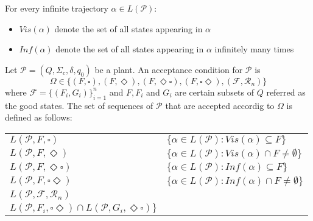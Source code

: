 \documentclass[table]{beamer}
\newcommand{\Plant}{\ensuremath{\mathcal{P}=(Q,\Sigma_c,\delta, q_0)}}
\newcommand{\AccpCond}{\ensuremath{\{(F,\square),(F,\Diamond ),(F,\Diamond\square),(F,\square\Diamond),(\mathcal{F},\mathcal{R}_n)\}}}
\begin{document}
\begin{frame}
	For every infinite trajectory $\alpha \in L(\mathcal{P})$:
	\begin{itemize}
		\item $Vis(\alpha)$ denote the set of all states appearing in $\alpha$
		\item $Inf(\alpha)$ denote the set of all states appearing in $\alpha$ infinitely many times
	\end{itemize}
\end{frame}

\begin{frame}
	\begin{dfn}
		Let $\Plant$ be a plant. An acceptance condition for $\mathcal{P}$ is
		$$ \Omega \in \AccpCond$$
		where $\mathcal{F} = \{(F_i,G_i)\}^{n}_{i=1}$ and $F, F_i$ and $G_i$ 
		are certain subsets of $Q$ referred as the good states. The set of sequences of $\mathcal{P}$ that are accepted
		accordig to $\Omega$ is defined as follows:
		\begin{adjustwidth}{-1cm}{-1cm}
		\begin{table}[]
			\begin{tabular}{ll}
			\hline
			\rowcolor{azzurro_chiaro}
			$L(\mathcal{P},F,\square)$ & $\{\alpha \in L(\mathcal{P}):Vis(\alpha)\subseteq F\}$ \\ 
			$L(\mathcal{P},F,\Diamond)$ & $\{\alpha \in L(\mathcal{P}):Vis(\alpha)\cap F \neq \emptyset\}$ \\ 
			\rowcolor{azzurro_chiaro}
			$L(\mathcal{P},F,\Diamond\square)$ & $\{\alpha \in L(\mathcal{P}):Inf(\alpha)\subseteq F\}$ \\ 
			$L(\mathcal{P},F,\square\Diamond)$ & $\{\alpha \in L(\mathcal{P}):Inf(\alpha)\cap F \neq \emptyset\}$\\ 
			\rowcolor{azzurro_chiaro}
			$L(\mathcal{P},\mathcal{F},\mathcal{R}_n)$ & \shortstack{
				$\{\alpha \in L(\mathcal{P}): \exists i \alpha \in$ \\
				$L(\mathcal{P},F_i,\square\Diamond) \cap L(\mathcal{P},G_i,\Diamond\square)\}$
			} \\ 
			\hline
			\end{tabular}
		\end{table}
		\end{adjustwidth}
	\end{dfn}
\end{frame}
\end{document}
